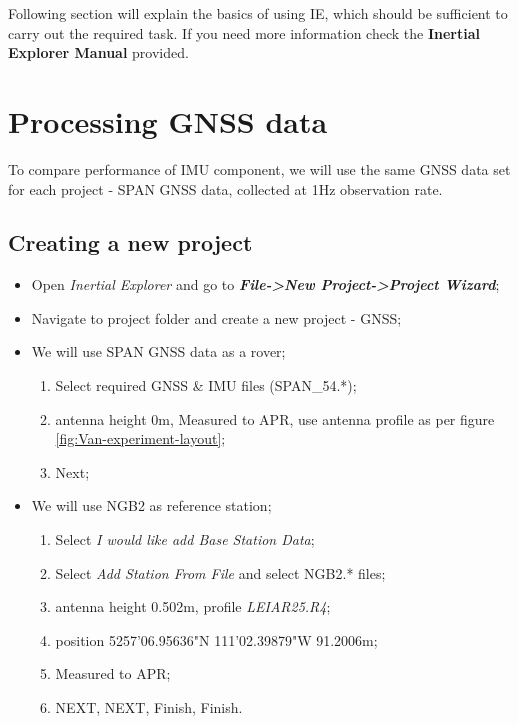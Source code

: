 \documentclass[british]{book}
\begin{document}
Following section will explain the basics of using IE, which should be sufficient to carry out the required task. If you need more information check the \textbf{Inertial Explorer Manual} provided.



\chapter{Processing GNSS data}\label{sec:Processing-GNSS-data}


To compare performance of IMU component, we will use the same GNSS data set for each project - SPAN GNSS data, collected at 1Hz observation rate.

\section{Creating a new project}\label{sec:Create-an-new}

\begin{itemize}
	\item Open \emph{Inertial Explorer} and go to \textbf{\emph{File->New Project->Project Wizard}};
	\item Navigate to project folder and create a new project - GNSS;
	\item We will use SPAN GNSS data as a rover;
	\begin{enumerate}
		\item Select required GNSS \& IMU files (SPAN\_54.{*});
		\item antenna height 0m, Measured to APR, use antenna profile as per figure \ref{fig:Van-experiment-layout};
		\item Next;
	\end{enumerate}
	\item We will use NGB2 as reference station;
	\begin{enumerate}
		\item Select \textit{I would like add Base Station Data};
		\item Select \textit{Add Station From File} and select NGB2.{*} files;
		\item antenna height 0.502m, profile \emph{LEIAR25.R4};
		\item position 52\textdegree{}57'06.95636"N  1\textdegree{}11'02.39879"W  91.2006m;
		\item Measured to APR;
		\item NEXT, NEXT, Finish, Finish.
	\end{enumerate}
\end{itemize}
\end{document}
